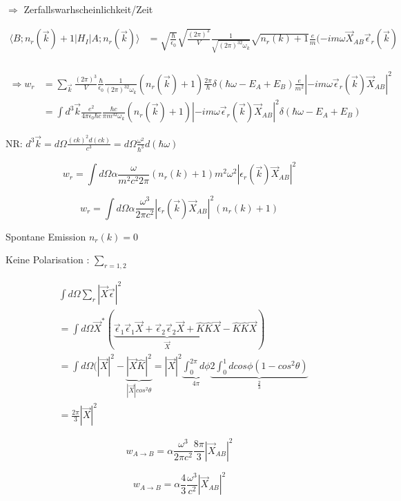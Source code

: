 \(\Rightarrow \) Zerfallswarhscheinlichkeit/Zeit


\begin{align}
\langle B;n_r(\vec k) +1 |H_I|A;n_r(\vec k)\rangle &= \sqrt{\frac{\hbar}{\epsilon_0}}\sqrt{\frac{(2\pi)^3}{V}}\frac{1}{\sqrt{(2\pi)^32\omega_k}}\sqrt{n_r(k)+1}\frac{e}{m}(-im\omega\vec X_{AB}\vec \epsilon_r(\vec k) \\
\end{align}


\begin{align}
\Rightarrow w_r &= \sum_{\vec k}\frac{(2\pi)^3}{V} \frac{\hbar}{\epsilon_0}\frac{1}{(2\pi)^32\omega_k}(n_r(\vec k)+1)\frac{2\pi}{\hbar}\delta(\hbar\omega-E_A+E_B)\frac{e}{m^2} |-im\omega\vec\epsilon_r(\vec k)\vec X_{AB}|^2\\
&=\int d^3\vec k\frac{e^2}{4\pi\epsilon_0\hbar c}\frac{\hbar c}{\pi m^32\omega_k}(n_r(\vec k)+1)|-im\omega\vec\epsilon_r(\vec k)\vec X_{AB}|^2 \delta(\hbar\omega-E_A+E_B)
\end{align}

NR: \(d^3\vec k = d\Omega \frac{(ck)^2 d(ck)}{c^3} = d\Omega \frac{\omega^2}{\hbar^3}d(\hbar\omega)\)



\[w_r = \int d\Omega \alpha \frac{\omega}{m^2c^2 2\pi}(n_r(k) +1) m^2\omega^2|\epsilon_r(\vec k)\vec X_{AB}|^2\]

\[\boxed{w_r = \int d\Omega \alpha \frac{\omega^3}{2\pi c^2} |\epsilon_r(\vec k)\vec X_{AB}|^2 (n_r(k) +1)}\]

Spontane Emission \(n_r(k) = 0\)


Keine Polarisation : \(\sum_{r=1,2}\)

\begin{align}
&\int d\Omega \sum_r|\vec X\vec \epsilon|^2\\
&=\int d\Omega \vec X^*(\underbrace{\vec \epsilon_1\vec \epsilon_1\vec X+\vec \epsilon_2\vec \epsilon_2\vec X +\hat K\hat K\vec X}_{\vec X}-\hat K\hat K\vec X)\\
&=\int d\Omega (|\vec X|^2-\underbrace{|\vec X\hat K|^2}_{|\vec X|cos^2\theta} = |\vec X|^2 \underbrace{\int_0^{2\pi}d\phi}_{4\pi}\underbrace{2\int_0^1dcos\phi(1-cos^2\theta)}_{\frac{2}{3}}\\
&=\frac{2\pi}{3}|\vec X|^2
\end{align}

\[w_{A\to B}= \alpha \frac{\omega^3}{2\pi c^2}\frac{8\pi}{3}|\vec X_{AB}|^2\]

\[\boxed{w_{A\to B}= \alpha\frac{4}{3} \frac{\omega^3}{c^2}|\vec X_{AB}|^2}\]

